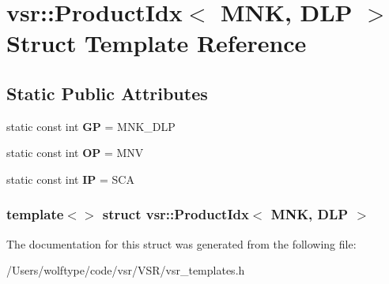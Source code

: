 \hypertarget{structvsr_1_1_product_idx_3_01_m_n_k_00_01_d_l_p_01_4}{\section{vsr\-:\-:Product\-Idx$<$ M\-N\-K, D\-L\-P $>$ Struct Template Reference}
\label{structvsr_1_1_product_idx_3_01_m_n_k_00_01_d_l_p_01_4}
}
\subsection*{Static Public Attributes}
\begin{DoxyCompactItemize}
\item 
\hypertarget{structvsr_1_1_product_idx_3_01_m_n_k_00_01_d_l_p_01_4_a907939d2618f10ae84dead447536850c}{static const int {\bfseries G\-P} = M\-N\-K\-\_\-\-D\-L\-P}\label{structvsr_1_1_product_idx_3_01_m_n_k_00_01_d_l_p_01_4_a907939d2618f10ae84dead447536850c}

\item 
\hypertarget{structvsr_1_1_product_idx_3_01_m_n_k_00_01_d_l_p_01_4_af44037be0632ec256067fbf932079180}{static const int {\bfseries O\-P} = M\-N\-V}\label{structvsr_1_1_product_idx_3_01_m_n_k_00_01_d_l_p_01_4_af44037be0632ec256067fbf932079180}

\item 
\hypertarget{structvsr_1_1_product_idx_3_01_m_n_k_00_01_d_l_p_01_4_a4485328de9fcb008bbc746caa0381226}{static const int {\bfseries I\-P} = S\-C\-A}\label{structvsr_1_1_product_idx_3_01_m_n_k_00_01_d_l_p_01_4_a4485328de9fcb008bbc746caa0381226}

\end{DoxyCompactItemize}
\subsubsection*{template$<$$>$ struct vsr\-::\-Product\-Idx$<$ M\-N\-K, D\-L\-P $>$}



The documentation for this struct was generated from the following file\-:\begin{DoxyCompactItemize}
\item 
/\-Users/wolftype/code/vsr/\-V\-S\-R/vsr\-\_\-templates.\-h\end{DoxyCompactItemize}
